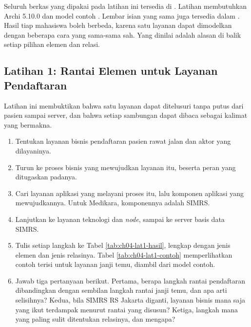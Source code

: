 Seluruh berkas yang dipakai pada latihan ini tersedia di
. Latihan membutuhkan Archi 5.10.0 dan model contoh
. Lembar isian yang
sama juga tersedia dalam
. Hasil tiap
mahasiswa boleh berbeda, karena satu layanan dapat dimodelkan dengan beberapa
cara yang sama-sama sah. Yang dinilai adalah alasan di balik setiap pilihan
elemen dan relasi.

\subsection*{Latihan 1: Rantai Elemen untuk Layanan Pendaftaran}

Latihan ini membuktikan bahwa satu layanan dapat ditelusuri tanpa putus dari
pasien sampai server, dan bahwa setiap sambungan dapat dibaca sebagai
kalimat yang bermakna.

\begin{enumerate}
  \item Tentukan layanan bisnis pendaftaran pasien rawat jalan dan aktor yang
        dilayaninya.
  \item Turun ke proses bisnis yang mewujudkan layanan itu, beserta peran yang
        ditugaskan padanya.
  \item Cari layanan aplikasi yang melayani proses itu, lalu komponen
        aplikasi yang mewujudkannya. Untuk Medikara, komponennya adalah SIMRS.
  \item Lanjutkan ke layanan teknologi dan \textit{node}, sampai ke
        server basis data SIMRS.
  \item Tulis setiap langkah ke Tabel \ref{tab:ch04-lat1-hasil}, lengkap
        dengan jenis elemen dan jenis relasinya. Tabel
        \ref{tab:ch04-lat1-contoh} memperlihatkan contoh terisi untuk
        layanan janji temu, diambil dari model contoh.
  \item Jawab tiga pertanyaan berikut. Pertama, berapa langkah rantai
        pendaftaran dibandingkan dengan sembilan langkah rantai janji temu,
        dan apa arti selisihnya? Kedua, bila SIMRS RS Jakarta diganti,
        layanan bisnis mana saja yang ikut terdampak menurut rantai yang
        disusun? Ketiga, langkah mana yang paling sulit ditentukan
        relasinya, dan mengapa?
\end{enumerate}

